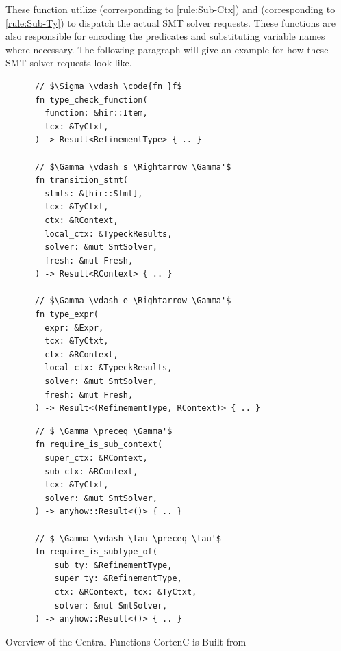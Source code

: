 \documentclass[twoside, english]{sdqthesis}
\theoremstyle{definition}
\begin{document}
These function utilize  (corresponding to \cref{rule:Sub-Ctx}) and  (corresponding to \cref{rule:Sub-Ty}) to dispatch the actual SMT solver requests. These functions are also responsible for encoding the predicates and substituting variable names where necessary. 
The following paragraph will give an example for how these SMT solver requests look like.

\begin{listing}[h]
  \begin{minipage}[t]{0.48\linewidth}
    \begin{verbatim}
      // $\Sigma \vdash \code{fn }f$
      fn type_check_function(
        function: &hir::Item,
        tcx: &TyCtxt,
      ) -> Result<RefinementType> { .. }
    
      // $\Gamma \vdash s \Rightarrow \Gamma'$
      fn transition_stmt( 
        stmts: &[hir::Stmt],
        tcx: &TyCtxt,
        ctx: &RContext,
        local_ctx: &TypeckResults,
        solver: &mut SmtSolver,
        fresh: &mut Fresh,
      ) -> Result<RContext> { .. } 
    
      // $\Gamma \vdash e \Rightarrow \Gamma'$ 
      fn type_expr(
        expr: &Expr,
        tcx: &TyCtxt,
        ctx: &RContext,
        local_ctx: &TypeckResults,
        solver: &mut SmtSolver,
        fresh: &mut Fresh,
      ) -> Result<(RefinementType, RContext)> { .. }
    \end{verbatim}
  \end{minipage}
  \begin{minipage}[t]{0.48\linewidth}
    \begin{verbatim}
      // $ \Gamma \preceq \Gamma'$
      fn require_is_sub_context(
        super_ctx: &RContext,
        sub_ctx: &RContext,
        tcx: &TyCtxt,
        solver: &mut SmtSolver,
      ) -> anyhow::Result<()> { .. } 

      // $ \Gamma \vdash \tau \preceq \tau'$
      fn require_is_subtype_of(
          sub_ty: &RefinementType,
          super_ty: &RefinementType,
          ctx: &RContext, tcx: &TyCtxt,
          solver: &mut SmtSolver,
      ) -> anyhow::Result<()> { .. }
    \end{verbatim}
  \end{minipage}
  \caption{Overview of the Central Functions CortenC is Built from}
  \label{lst:architecture-cortenc}
\end{listing}
\end{document}
